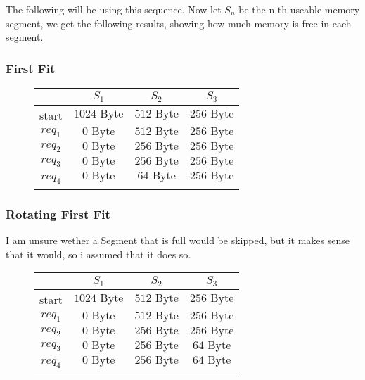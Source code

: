\documentclass[a4paper, 11pt]{article}
\begin{document}
    The following will be using this sequence. Now let $S_n$ be the n-th useable memory segment, we get the following results, showing how much memory is free in each segment.
    \subsubsection{First Fit}
    \begin{figure}[h]
          \centering
          \begin{tabular}{|c|c|c|c|}
            \hline
            &$S_1$&$S_2$&$S_3$\\\hline
            start&$1024 \mbox{ Byte}$&$512 \mbox{ Byte}$&$256 \mbox{ Byte}$\\
            $req_1$&$0 \mbox{ Byte}$&$512 \mbox{ Byte}$&$256 \mbox{ Byte}$\\
            $req_2$&$0 \mbox{ Byte}$&$256 \mbox{ Byte}$&$256 \mbox{ Byte}$\\
            $req_3$&$0 \mbox{ Byte}$&$256 \mbox{ Byte}$&$256 \mbox{ Byte}$\\\hline\hline
            \multirow{2}{*}{$req_4$}&$0 \mbox{ Byte}$&$64 \mbox{ Byte}$&$256 \mbox{ Byte}$\\ \cline{2-4}&\multicolumn{3}{c|}{\color{red}{Cannot fit into $S_2$}}\\
            \hline
      
          \end{tabular}
    \end{figure}

    \subsubsection{Rotating First Fit}
    I am unsure wether a Segment that is full would be skipped, but it makes sense that it would, so i assumed that it does so.
    \begin{figure}[h]
          \centering
          \begin{tabular}{|c|c|c|c|}
            \hline
            &$S_1$&$S_2$&$S_3$\\\hline
            start&$1024 \mbox{ Byte}$&$512 \mbox{ Byte}$&$256 \mbox{ Byte}$\\
            $req_1$&$0 \mbox{ Byte}$&$512 \mbox{ Byte}$&$256 \mbox{ Byte}$\\
            $req_2$&$0 \mbox{ Byte}$&$256 \mbox{ Byte}$&$256 \mbox{ Byte}$\\
            $req_3$&$0 \mbox{ Byte}$&$256 \mbox{ Byte}$&$64 \mbox{ Byte}$\\\hline\hline
            \multirow{2}{*}{$req_4$}&$0 \mbox{ Byte}$&$256 \mbox{ Byte}$&$64 \mbox{ Byte}$\\ \cline{2-4}&\multicolumn{3}{c|}{\color{red}{Cannot fit into $S_2$}}\\
            \hline
      
          \end{tabular}
    \end{figure}
\end{document}
